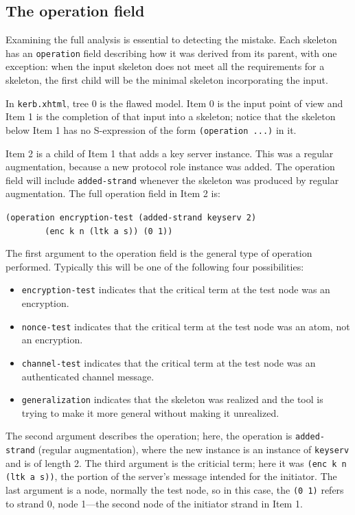 \subsection{The operation field}
\label{sec:operation}
 Examining the full {\cpsa} analysis is
essential to detecting the mistake.  Each skeleton has an
\texttt{operation} field describing how it was derived from its
parent, with one exception: when the input skeleton does not meet all
the requirements for a skeleton, the first child will be the minimal
skeleton incorporating the input.

In \texttt{kerb.xhtml}, tree 0 is the flawed model.  Item 0 is the input
point of view and Item 1 is the completion of that input into a
skeleton; notice that the skeleton below Item 1 has no S-expression of
the form \texttt{(operation ...)} in it.

 Item 2 is a child of Item 1 that adds a key
server instance.  This was a regular augmentation, because a new
protocol role instance was added.  The operation field will include
\texttt{added-strand} whenever the skeleton was produced by regular
augmentation.  The full operation field in Item 2 is:

\begin{center}
\verb|(operation encryption-test (added-strand keyserv 2)|\\
\verb|        (enc k n (ltk a s)) (0 1))|
\end{center}

The first argument to the operation field is the general type of
operation performed.  Typically this will be one of the following
four possibilities:

\begin{itemize}
\item \texttt{encryption-test} indicates that the critical term at the
  test node was an encryption.
\item \texttt{nonce-test} indicates that the critical term at the test
  node was an atom, not an encryption.
\item \texttt{channel-test} indicates that the critical term at the test
  node was an authenticated channel message.
\item \texttt{generalization} indicates that the skeleton was realized
  and the tool is trying to make it more general without making it
  unrealized.
\end{itemize}

The second argument describes the operation; here, the operation is
\texttt{added-strand} (regular augmentation), where the new instance
is an instance of \texttt{keyserv} and is of length 2.  The third
argument is the criticial term; here it was \texttt{(enc k n (ltk a s))},
the portion of the server's message intended for the initiator.  The
last argument is a node, normally the test node, so in this case, the
\texttt{(0 1)} refers to strand 0, node 1---the second node of the
initiator strand in Item 1.


